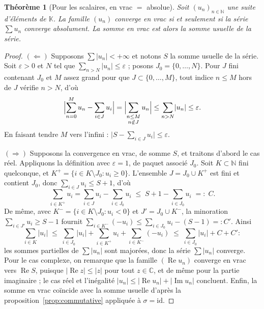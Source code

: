 \documentclass[11pt,a4paper]{article}
\theoremstyle{plain}
\newtheorem{theoreme}{Théorème}[section]
\theoremstyle{definition}
\theoremstyle{remark}
\newcommand{\C}{\mathbb{C}}
\newcommand{\N}{\mathbb{N}}
\newcommand{\K}{\mathbb{K}}
\newcommand{\eps}{\varepsilon}
\numberwithin{equation}{section}
\begin{document}
\begin{theoreme}[Pour les scalaires, en vrac $=$ absolue]\label{thm:vrac-abs}
Soit $(u_n)_{n\in\N}$ une suite d'éléments de $\K$. La famille $(u_n)$
converge en vrac si et seulement si la série $\sum u_n$ converge
\emph{absolument}. La somme en vrac est alors la somme usuelle de la
série.
\end{theoreme}

\begin{proof}
$(\Leftarrow)$ Supposons $\sum\lvert u_n\rvert<+\infty$ et notons $S$ la
somme usuelle de la série. Soit $\eps>0$ et $N$ tel que
$\sum_{n>N}\lvert u_n\rvert\leq\eps$ ; posons $J_0=\{0,\dots,N\}$. Pour
$J$ fini contenant $J_0$ et $M$ assez grand pour que
$J\subset\{0,\dots,M\}$, tout indice $n\leq M$ hors de $J$ vérifie $n>N$,
d'où
\[
\Bigl\lvert \sum_{n=0}^{M}u_n-\sum_{i\in J}u_i\Bigr\rvert
=\Bigl\lvert \sum_{\substack{n\leq M\\ n\notin J}}u_n\Bigr\rvert
\leq \sum_{n>N}\lvert u_n\rvert\leq\eps .
\]
En faisant tendre $M$ vers l'infini :
$\bigl\lvert S-\sum_{i\in J}u_i\bigr\rvert\leq\eps$.

$(\Rightarrow)$ Supposons la convergence en vrac, de somme $S$, et
traitons d'abord le cas réel. Appliquons la définition avec $\eps=1$, de
paquet associé $J_0$. Soit $K\subset\N$ fini quelconque, et
$K^{+}=\{i\in K\setminus J_0 : u_i\geq 0\}$. L'ensemble $J=J_0\cup K^{+}$
est fini et contient $J_0$, donc $\sum_{i\in J}u_i\leq S+1$, d'où
\[
\sum_{i\in K^{+}}u_i=\sum_{i\in J}u_i-\sum_{i\in J_0}u_i
\;\leq\; S+1-\sum_{i\in J_0}u_i\;=:\;C .
\]
De même, avec $K^{-}=\{i\in K\setminus J_0 : u_i<0\}$ et
$J'=J_0\cup K^{-}$, la minoration $\sum_{i\in J'}u_i\geq S-1$ fournit
$\sum_{i\in K^{-}}(-u_i)\leq \sum_{i\in J_0}u_i-(S-1)=:C'$. Ainsi
\[
\sum_{i\in K}\lvert u_i\rvert
\;\leq\; \sum_{i\in J_0}\lvert u_i\rvert
+\sum_{i\in K^{+}}u_i+\sum_{i\in K^{-}}(-u_i)
\;\leq\; \sum_{i\in J_0}\lvert u_i\rvert+C+C' :
\]
les sommes partielles de $\sum\lvert u_n\rvert$ sont majorées, donc la
série $\sum\lvert u_n\rvert$ converge. Pour le cas complexe, on remarque
que la famille $(\operatorname{Re}u_n)$ converge en vrac vers
$\operatorname{Re}S$, puisque
$\lvert\operatorname{Re}z\rvert\leq\lvert z\rvert$ pour tout $z\in\C$, et
de même pour la partie imaginaire ; le cas réel et l'inégalité
$\lvert u_n\rvert\leq\lvert\operatorname{Re}u_n\rvert
+\lvert\operatorname{Im}u_n\rvert$ concluent. Enfin, la somme en vrac
coïncide avec la somme usuelle d'après la
proposition~\ref{prop:commutative} appliquée à $\sigma=\mathrm{id}$.
\end{proof}
\end{document}
